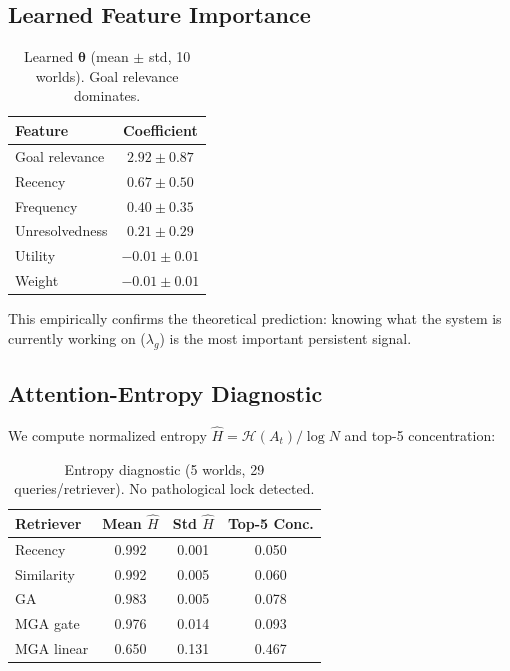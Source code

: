 \documentclass{article}
\newcommand{\entropy}{\mathcal{H}}
\begin{document}
\subsection{Learned Feature Importance}

\begin{table}[ht]
\centering
\caption{Learned $\boldsymbol{\theta}$ (mean $\pm$ std, 10 worlds). Goal relevance dominates.}
\vspace{0.5em}
\begin{tabular}{lc}
\toprule
\textbf{Feature} & \textbf{Coefficient} \\
\midrule
Goal relevance & $2.92 \pm 0.87$ \\
Recency & $0.67 \pm 0.50$ \\
Frequency & $0.40 \pm 0.35$ \\
Unresolvedness & $0.21 \pm 0.29$ \\
Utility & $-0.01 \pm 0.01$ \\
Weight & $-0.01 \pm 0.01$ \\
\bottomrule
\end{tabular}
\end{table}

This empirically confirms the theoretical prediction: knowing what the system is currently working on ($\lambda_g$) is the most important persistent signal.

\subsection{Attention-Entropy Diagnostic}

We compute normalized entropy $\hat{H} = \entropy(A_t) / \log N$ and top-5 concentration:

\begin{table}[ht]
\centering
\caption{Entropy diagnostic (5 worlds, 29 queries/retriever). No pathological lock detected.}
\vspace{0.5em}
\begin{tabular}{lccc}
\toprule
\textbf{Retriever} & \textbf{Mean $\hat{H}$} & \textbf{Std $\hat{H}$} & \textbf{Top-5 Conc.} \\
\midrule
Recency & 0.992 & 0.001 & 0.050 \\
Similarity & 0.992 & 0.005 & 0.060 \\
GA & 0.983 & 0.005 & 0.078 \\
MGA gate & 0.976 & 0.014 & 0.093 \\
MGA linear & 0.650 & 0.131 & 0.467 \\
\bottomrule
\end{tabular}
\end{table}
\end{document}
